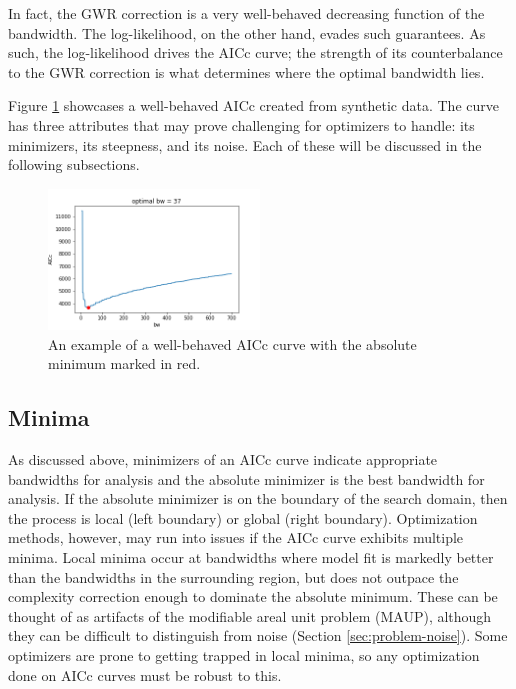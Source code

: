 \documentclass[letterpaper,12pt,twocolumn]{article}
\begin{document}
In fact, the GWR correction is a very well-behaved decreasing function of the bandwidth. The log-likelihood, on the other hand, evades such guarantees. As such, the log-likelihood drives the AICc curve; the strength of its counterbalance to the GWR correction is what determines where the optimal bandwidth lies.

Figure \ref{fig:sample-aicc} showcases a well-behaved AICc created from synthetic data. The curve has three attributes that may prove challenging for optimizers to handle: its minimizers, its steepness, and its noise. Each of these will be discussed in the following subsections.

\begin{figure}
    \centering
    \includegraphics[width=0.5\textwidth]{../figures/sample-aicc.png} 
    \caption{An example of a well-behaved AICc curve with the absolute minimum marked in red.}
    \label{fig:sample-aicc}
\end{figure}

\subsection{Minima}
As discussed above, minimizers of an AICc curve indicate appropriate bandwidths for analysis and the absolute minimizer is the best bandwidth for analysis. If the absolute minimizer is on the boundary of the search domain, then the process is local (left boundary) or global (right boundary). Optimization methods, however, may run into issues if the AICc curve exhibits multiple minima. Local minima occur at bandwidths where model fit is markedly better than the bandwidths in the surrounding region, but does not outpace the complexity correction enough to dominate the absolute minimum. These can be thought of as artifacts of the modifiable areal unit problem (MAUP), although they can be difficult to distinguish from noise (Section \ref{sec:problem-noise}). Some optimizers are prone to getting trapped in local minima, so any optimization done on AICc curves must be robust to this. 
\end{document}
